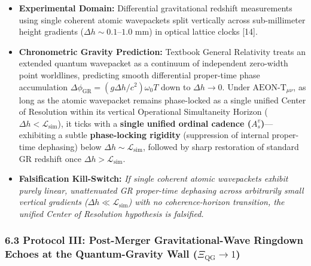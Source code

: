 \documentclass[
]{article}
\providecommand{\tightlist}{%
  \setlength{\itemsep}{0pt}\setlength{\parskip}{0pt}}
\begin{document}
\begin{itemize}
\tightlist
\item
  \textbf{Experimental Domain:} Differential gravitational redshift
  measurements using single coherent atomic wavepackets split vertically
  across sub-millimeter height gradients
  (\(\Delta h \sim 0.1\text{--}1.0\text{ mm}\)) in optical lattice
  clocks {[}14{]}.
\item
  \textbf{Chronometric Gravity Prediction:} Textbook General Relativity
  treats an extended quantum wavepacket as a continuum of independent
  zero-width point worldlines, predicting smooth differential
  proper-time phase accumulation
  \(\Delta\phi_{\mathrm{GR}} = (g \Delta h / c^2)\omega_0 T\) down to
  \(\Delta h \to 0\). Under \(\text{AEON-T}_{\mu\nu}\), as long as the
  atomic wavepacket remains phase-locked as a single unified Center of
  Resolution within its vertical Operational Simultaneity Horizon
  (\(\Delta h < \mathcal{L}_{\mathrm{sim}}\)), it ticks with a
  \textbf{single unified ordinal cadence (\(A_s^v\))}---exhibiting a
  subtle \textbf{phase-locking rigidity} (suppression of internal
  proper-time dephasing) below
  \(\Delta h \sim \mathcal{L}_{\mathrm{sim}}\), followed by sharp
  restoration of standard GR redshift once
  \(\Delta h > \mathcal{L}_{\mathrm{sim}}\).
\item
  \textbf{Falsification Kill-Switch:} \emph{If single coherent atomic
  wavepackets exhibit purely linear, unattenuated GR proper-time
  dephasing across arbitrarily small vertical gradients
  (\(\Delta h \ll \mathcal{L}_{\mathrm{sim}}\)) with no
  coherence-horizon transition, the unified Center of Resolution
  hypothesis is falsified.}
\end{itemize}

\subsubsection{\texorpdfstring{6.3 Protocol III: Post-Merger
Gravitational-Wave Ringdown Echoes at the Quantum-Gravity Wall
(\(\Xi_{\mathrm{QG}} \to 1\))}{6.3 Protocol III: Post-Merger Gravitational-Wave Ringdown Echoes at the Quantum-Gravity Wall (\textbackslash Xi\_\{\textbackslash mathrm\{QG\}\} \textbackslash to 1)}}\label{protocol-iii-post-merger-gravitational-wave-ringdown-echoes-at-the-quantum-gravity-wall-xi_mathrmqg-to-1}
\end{document}
